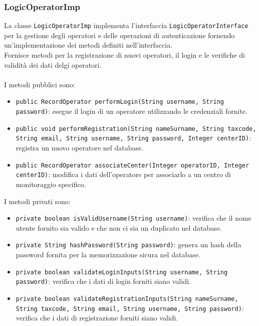 \subsubsection{LogicOperatorImp}
La classe \texttt{LogicOperatorImp} implementa l'interfaccia \texttt{LogicOperatorInterface} per la gestione degli operatori e delle operazioni di autenticazione fornendo 
un'implementazione dei metodi definiti nell'interfaccia.\\
Fornisce metodi per la registrazione di nuovi operatori, il login e le verifiche di validità dei dati delgi operatori.\\
\\
I metodi pubblici sono:
\begin{itemize}
      \item \texttt{public RecordOperator performLogin(String username, String password)}: esegue il login di un operatore utilizzando le credenziali fornite.
      \item \texttt{public void performRegistration(String nameSurname, String taxcode, String email, String username, String password, Integer centerID)}: registra un nuovo operatore nel database.
      \item \texttt{public RecordOperator associateCenter(Integer operatorID, Integer centerID)}: modifica i dati dell'operatore per associarlo a un centro di monitoraggio specifico.
\end{itemize}
I metodi privati sono:
\begin{itemize}
      \item \texttt{private boolean isValidUsername(String username)}: verifica che il nome utente fornito sia valido e che non ci sia un duplicato nel database.
      \item \texttt{private String hashPassword(String password)}: genera un hash della password fornita per la memorizzazione sicura nel database.
      \item \texttt{private boolean validateLoginInputs(String username, String password)}: verifica che i dati di login forniti siano validi.
      \item \texttt{private boolean validateRegistrationInputs(String nameSurname, String taxcode, String email, String username, String password)}: verifica che i dati di registrazione forniti siano validi.
\end{itemize}